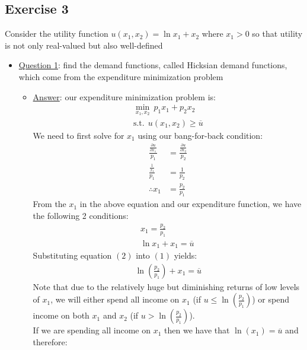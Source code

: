 \documentclass{article}
\begin{document}
\subsection{Exercise 3}
Consider the utility function $u(x_{1}, x_{2}) = \ln x_{1} + x_{2}$ where $x_{1} > 0$ so that utility is not only real-valued but also well-defined \par \vspace{0.3em}
\begin{itemize}
  \item  \underline{Question 1}: find the demand functions, called Hicksian demand functions, which come from the expenditure minimization problem
  \begin{itemize}
    \item  \underline{Answer}: our expenditure minimization problem is:
    \begin{gather*}
      \min_{x_{1},x_{2}} \ p_{1}x_{1} + p_{2}x_{2} \\
      \text{s.t.} \ \ u(x_{1}, x_{2}) \geq \overline{u}
    \end{gather*}
    We need to first solve for $x_{1}$ using our bang-for-back condition:
    \begin{align*}
      \frac{\tfrac{\partial u}{\partial x_{1}}}{p_{1}} &= \frac{\tfrac{\partial u}{\partial x_{2}}}{p_{2}} \\
      \frac{\tfrac{1}{x_{1}}}{p_{1}} &= \frac{1}{p_{2}} \\
      \therefore x_{1} &= \frac{p_{2}}{p_{1}}
    \end{align*}
    From the $x_{1}$ in the above equation and our expenditure function, we have the following 2 conditions:
    \begin{gather*}
      x_{1} = \frac{p_{2}}{p_{1}} \ \tag{1} \\
      \ln x_{1} + x_{1} = \overline{u} \ \tag{2}
    \end{gather*}
    Substituting equation $(2)$ into $(1)$ yields:
    \begin{gather*}
      \ln (\frac{p_{2}}{p_{1}}) + x_{1} = \overline{u}
    \end{gather*}
    Note that due to the relatively huge but diminishing returns of low levels of $x_{1}$, we will either spend all income on $x_{1}$ (if $u \leq \ln (\frac{p_{2}}{p_{1}})$) or spend income on both $x_{1}$ and $x_{2}$ (if $u > \ln (\frac{p_{2}}{p_{1}})$). \\
    If we are spending all income on $x_{1}$ then we have that $\ln(x_{1}) = \overline{u}$ and therefore:
    \begin{align*}

\end{align*}
\end{itemize}
\end{itemize}
\end{document}
